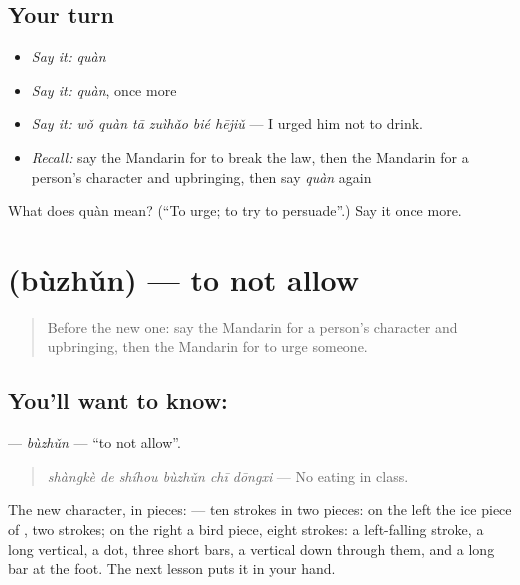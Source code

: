 \subsection*{Your turn}
\begin{itemize}
\raggedright
  \item \emph{Say it:} \emph{quàn}
  \item \emph{Say it:} \emph{quàn}, once more
  \item \emph{Say it:} \emph{wǒ quàn tā zuìhǎo bié hējiǔ} — I urged him not to drink.
  \item \emph{Recall:} say the Mandarin for to break the law, then the Mandarin for a person's character and upbringing, then say \emph{quàn} again
\end{itemize}

\begin{tcolorbox}[breakable,colback=teal!4,colframe=teal!35!black,title={Before you move on}]
What does quàn mean? (\textquotedblleft{}To urge; to try to persuade\textquotedblright{}.) Say it once more.
\end{tcolorbox}
\section[\texorpdfstring{\zh{不准} (bùzhǔn)}{不准 (bùzhǔn)}]{ (bùzhǔn) — to not allow}

\label{lesson:ZH-C364-buzhun}



\begin{quote}
Before the new one: say the Mandarin for a person's character and upbringing, then the Mandarin for to urge someone.
\end{quote}

\subsection*{You'll want to know: }
\textbf{} — \emph{bùzhǔn} — \textquotedblleft{}to not allow\textquotedblright{}.

\begin{quote}
\textbf{} \emph{shàngkè de shíhou bùzhǔn chī dōngxi} — No eating in class.
\end{quote}

The new character, in pieces:  — ten strokes in two pieces: on the left the ice piece of , two strokes; on the right a bird piece, eight strokes: a left-falling stroke, a long vertical, a dot, three short bars, a vertical down through them, and a long bar at the foot. The next lesson puts it in your hand.

